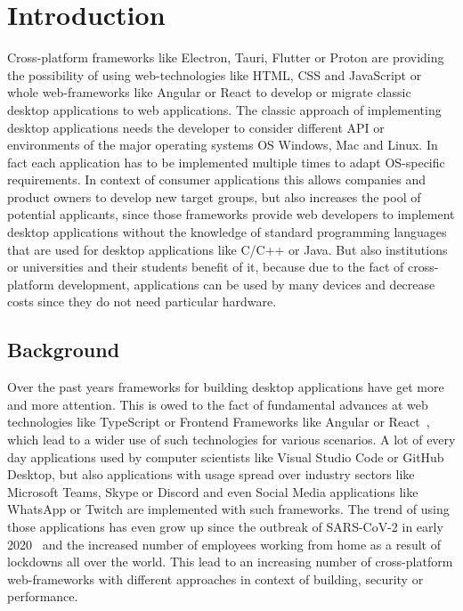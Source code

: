 \section{Introduction}
\label{sec:introduction}
Cross-platform frameworks like Electron, Tauri, Flutter or Proton are providing the possibility of using web-technologies like \ac{HTML}, \ac{CSS} and JavaScript or whole web-frameworks
like Angular or React to develop or migrate classic desktop applications to web applications.
The classic approach of implementing desktop applications needs the developer to consider different \ac{API} or environments of the major operating systems \ac{OS}
Windows, Mac and Linux.
In fact each application has to be implemented multiple times to adapt OS-specific requirements.
In context of consumer applications this allows companies and product owners to develop new target groups, but also increases the pool of potential applicants,
since those frameworks provide web developers to implement desktop applications without the knowledge of standard programming languages that are used for desktop applications
like C/C++ or Java.
But also institutions or universities and their students benefit of it, because due to the fact of cross-platform development, applications can be used by many devices and decrease costs
since they do not need particular hardware.
\subsection{Background}\label{subsec:background}
Over the past years frameworks for building desktop applications have get more and more attention.
This is owed to the fact of fundamental advances at web technologies like TypeScript or Frontend Frameworks like Angular or React~\cite{pernice:icalepcs2019-wempr006},
which lead to a wider use of such technologies for various scenarios.
A lot of every day applications used by computer scientists like Visual Studio Code or GitHub Desktop, but also applications with usage spread over industry sectors
like Microsoft Teams, Skype or Discord and even Social Media applications like WhatsApp or Twitch are implemented with such frameworks.
The trend of using those applications has even grow up since the outbreak of SARS-CoV-2 in early 2020~\cite{Gorbalenya2020} and the increased number of employees working from home
as a result of lockdowns all over the world.
This lead to an increasing number of cross-platform web-frameworks with different approaches in context of building, security or performance.


